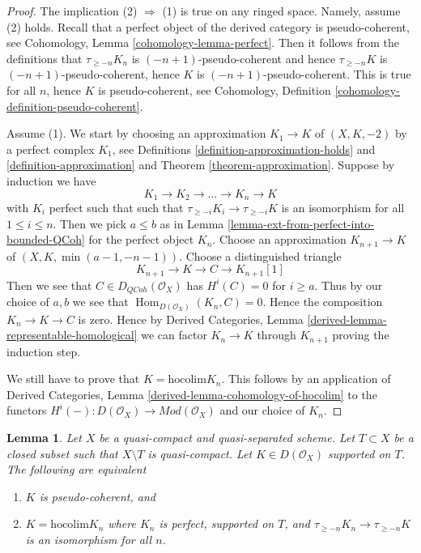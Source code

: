 \documentclass{stacks-project}
\theoremstyle{plain}
\newtheorem{lemma}[subsection]{Lemma}
\theoremstyle{definition}
\theoremstyle{remark}
\numberwithin{equation}{subsection}
\def\Hom{\mathop{\mathrm{Hom}}\nolimits}
\def\QCoh{\mathit{QCoh}}
\begin{document}
\begin{proof}
The implication (2) $\Rightarrow$ (1) is true on any ringed space.
Namely, assume (2) holds. Recall that a perfect object of the derived
category is pseudo-coherent, see
Cohomology, Lemma \ref{cohomology-lemma-perfect}.
Then it follows from the definitions that
$\tau_{\geq -n}K_n$ is $(-n + 1)$-pseudo-coherent
and hence $\tau_{\geq -n}K$ is $(-n + 1)$-pseudo-coherent,
hence $K$ is $(-n + 1)$-pseudo-coherent. This is true for
all $n$, hence $K$ is pseudo-coherent, see
Cohomology, Definition \ref{cohomology-definition-pseudo-coherent}.

\medskip\noindent
Assume (1). We start by choosing an approximation
$K_1 \to K$ of $(X, K, -2)$ by a perfect complex $K_1$, see
Definitions \ref{definition-approximation-holds} and
\ref{definition-approximation} and
Theorem \ref{theorem-approximation}.
Suppose by induction we have
$$
K_1 \to K_2 \to \ldots \to K_n \to K
$$
with $K_i$ perfect such that
such that $\tau_{\geq -i}K_i \to \tau_{\geq -i}K$ is an isomorphism
for all $1 \leq i \leq n$. Then we pick $a \leq b$ as in
Lemma \ref{lemma-ext-from-perfect-into-bounded-QCoh}
for the perfect object $K_n$. Choose an approximation
$K_{n + 1} \to K$ of $(X, K, \min(a - 1, -n - 1))$.
Choose a distinguished triangle
$$
K_{n + 1} \to K \to C \to K_{n + 1}[1]
$$
Then we see that $C \in D_\QCoh(\mathcal{O}_X)$ has
$H^i(C) = 0$ for $i \geq a$. Thus by our choice of $a, b$
we see that $\Hom_{D(\mathcal{O}_X)}(K_n, C) = 0$.
Hence the composition $K_n \to K \to C$ is zero. Hence by
Derived Categories, Lemma \ref{derived-lemma-representable-homological}
we can factor $K_n \to K$ through $K_{n + 1}$
proving the induction step.

\medskip\noindent
We still have to prove that $K = \text{hocolim} K_n$.
This follows by an application of
Derived Categories, Lemma \ref{derived-lemma-cohomology-of-hocolim}
to the functors
$H^i( - ) : D(\mathcal{O}_X) \to \textit{Mod}(\mathcal{O}_X)$
and our choice of $K_n$.
\end{proof}

\begin{lemma}
\label{lemma-pseudo-coherent-hocolim-with-support}
Let $X$ be a quasi-compact and quasi-separated scheme.
Let $T \subset X$ be a closed subset such that $X \setminus T$
is quasi-compact. Let $K \in D(\mathcal{O}_X)$ supported on $T$.
The following are equivalent
\begin{enumerate}
\item $K$ is pseudo-coherent, and
\item $K = \text{hocolim} K_n$ where
$K_n$ is perfect, supported on $T$, and
$\tau_{\geq -n}K_n \to \tau_{\geq -n}K$ is an isomorphism for all $n$.
\end{enumerate}
\end{lemma}
\end{document}

